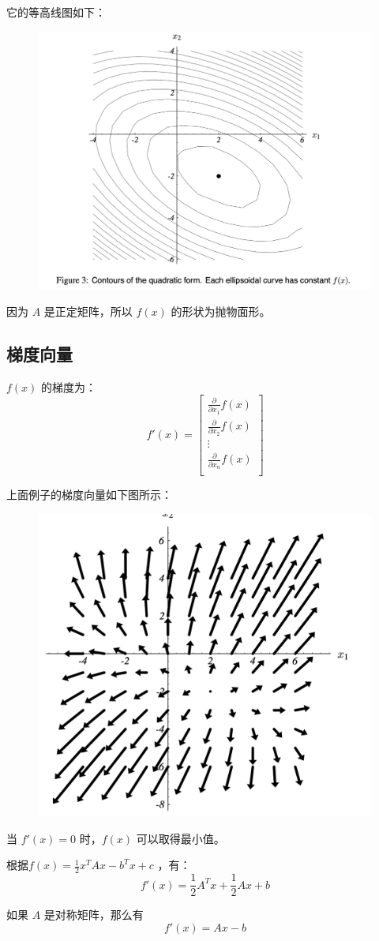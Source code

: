 \documentclass[12pt]{article}
\begin{document}
它的等高线图如下：
\begin{figure}[H]
    \centering
    \includegraphics[width=.6\textwidth]{fig/CG_Plot_Eq_3.png}
\end{figure}

因为 $A$ 是正定矩阵，所以 $f(x)$ 的形状为抛物面形。

\subsection{梯度向量}
$f(x)$ 的梯度为：
$$
f'(x) = \begin{bmatrix}
\frac{\partial}{\partial x_1}f(x) \\
\frac{\partial}{\partial x_2}f(x) \\
\vdots \\
\frac{\partial}{\partial x_n}f(x) \\
\end{bmatrix}
$$

上面例子的梯度向量如下图所示：
\begin{figure}[H]
    \centering
    \includegraphics[width=.4\textwidth]{fig/CG_Plot_Eq_4.png}
\end{figure}
当 $f'(x) = 0$ 时，$f(x)$ 可以取得最小值。

根据$f(x) = \frac{1}{2}x^TAx - b^Tx + c$ ，有：
$$
f'(x)  = \frac{1}{2}A^Tx + \frac{1}{2}Ax + b
$$

如果 $A$ 是对称矩阵，那么有
$$
f'(x) = Ax - b
$$
\end{document}
